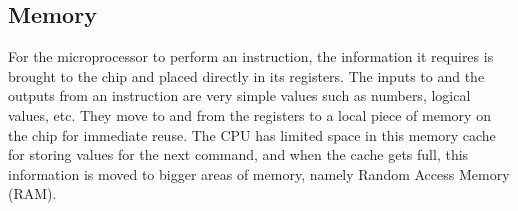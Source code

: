    

\subsection{Memory}  
For the microprocessor to perform an instruction, the information it
requires is brought to the chip and placed directly in its
registers. The inputs to and the outputs from an instruction are very
simple values such as numbers, logical values, etc. They move to and
from the registers to a local piece of memory on the chip for
immediate reuse. The CPU has limited space in this memory cache for
storing values for the next command, and when the cache gets full,
this information is moved to bigger areas of memory, namely Random
Access Memory (RAM).


